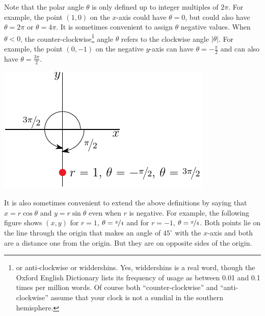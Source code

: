 Note that the polar angle $\theta$ is only defined up to integer multiples
of $2\pi$. For example, the point $(1,0)$ on the $x$-axis could have 
$\theta=0$, but could also have $\theta=2\pi$ or $\theta=4\pi$. It is sometimes
convenient to assign $\theta$ negative values. When $\theta<0$, the
counter-clockwise\footnote{or anti-clockwise or widdershins.
Yes, widdershins is a real word, though the Oxford English Dictionary
lists its frequency of usage as between 0.01 and 0.1 times
per million words. Of course both ``counter-clockwise''
and ``anti-clockwise'' assume that your clock is not a sundial in the
southern hemisphere.} 
angle $\theta$ refers to the clockwise angle $|\theta|$. For example,
the point $(0,-1)$ on the negative $y$-axis can have $\theta=-\frac{\pi}{2}$
and can also have $\theta=\frac{3\pi}{2}$.\begin{efig}
\begin{center}
    \includegraphics{polarNegTh.pdf}
\end{center}
\end{efig}



It is also sometimes convenient to extend the above definitions by saying that
$x=r\cos\theta$ and $y=r\sin\theta$ even when $r$ is negative. For example,
the following figure shows $(x,y)$ for $r=1$, $\theta=\nicefrac{\pi}{4}$
and for $r=-1$, $\theta=\nicefrac{\pi}{4}$.
Both points lie on the  line through the origin that makes an angle of
$45^\circ$ with the $x$-axis and both are a distance one from the origin.
But they are on opposite sides of the origin.


